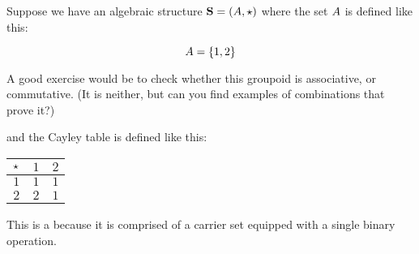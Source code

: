 \documentclass[../../../main.tex]{subfiles}
\begin{document}
\begin{fexample}

Suppose we have an algebraic structure $\algebra{S} = (\set{A}, \opSymbol/)$ where the set $A$ is defined like this:

\begin{equation*}
  A = \{ 1, 2 \}
\end{equation*}

\begin{aside}
  \begin{remark}
    A good exercise would be to check whether this groupoid is associative, or commutative. (It is neither, but can you find examples of combinations that prove it?)
  \end{remark}
\end{aside}

and the Cayley table is defined like this:

\begin{center}
  \begin{tabular}{| c || c | c | }
    \hline
    $\opSymbol/$ & $1$ & $2$ \\ \hline \hline
    $1$          & $1$ & $1$ \\ \hline
    $2$          & $2$ & $1$ \\ \hline
  \end{tabular}
\end{center}

This is a  because it is comprised of a carrier set equipped with a single binary operation. 

\end{fexample}
\end{document}
